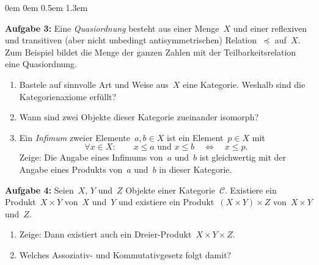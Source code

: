 \documentclass[a4paper,ngerman]{scrartcl}
\theoremstyle{definition}
\theoremstyle{plain}
\theoremstyle{remark}
\newcommand{\C}{\mathcal{C}}
\begin{document}
\begin{list}{}{0em \leftmargin0em \itemindent0.5em \itemsep 1.3em}
\item[\textbf{Aufgabe 3:}]
Eine \emph{Quasiordnung} besteht aus einer Menge~$X$ und einer reflexiven und
transitiven (aber nicht unbedingt antisymmetrischen) Relation~$\preceq$
auf~$X$. Zum Beispiel bildet die Menge der ganzen Zahlen mit der
Teilbarkeitsrelation eine Quasiordnung.
\begin{enumerate}
\item Bastele auf sinnvolle Art und Weise aus~$X$ eine Kategorie. Weshalb sind
die Ka\-te\-go\-rien\-axi\-ome erfüllt?
\item Wann sind zwei Objekte dieser Kategorie zueinander isomorph?
\item Ein \emph{Infimum} zweier Elemente~$a,b\in X$ ist ein Element~$p \in X$
mit
\[ \forall x \in X{:}\qquad x \leq a \text{ und } x \leq b \quad\Longleftrightarrow\quad x \leq p.
\]
Zeige: Die Angabe eines Infimums von~$a$ und~$b$ ist gleichwertig mit der
Angabe eines Produkts von~$a$ und~$b$ in dieser Kategorie.
\end{enumerate}

\item[\textbf{Aufgabe 4:}] Seien~$X$, $Y$ und~$Z$ Objekte einer Kategorie~$\C$.
Existiere ein Produkt~$X \times Y$ von~$X$ und~$Y$ und existiere ein
Produkt~$(X \times Y) \times Z$ von~$X \times Y$ und~$Z$.
\begin{enumerate}
\item Zeige: Dann existiert auch ein Dreier-Produkt~$X \times Y \times Z$.
\item Welches Assoziativ- und Kommutativgesetz folgt damit?
\end{enumerate}
\end{list}
\end{document}
